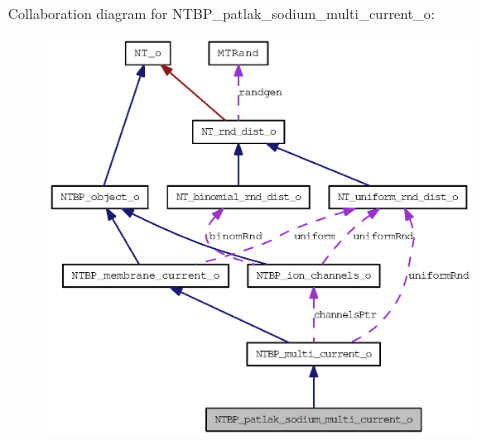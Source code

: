 Collaboration diagram for NTBP\_\-patlak\_\-sodium\_\-multi\_\-current\_\-o:
\nopagebreak
\begin{figure}[H]
\begin{center}
\leavevmode
\includegraphics[width=400pt]{class_n_t_b_p__patlak__sodium__multi__current__o__coll__graph}
\end{center}
\end{figure}
